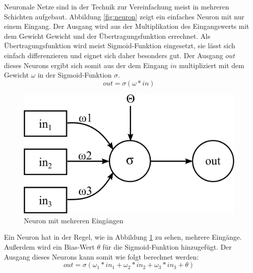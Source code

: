 Neuronale Netze sind in der Technik zur Vereinfachung meist in mehreren Schichten aufgebaut. Abbildung \ref{fig:neuron} zeigt ein einfaches Neuron mit nur einem Eingang. Der Ausgang wird aus der Multiplikation des Eingangswerts mit dem Gewicht Gewicht und der Übertragungsfunktion errechnet. Als Übertragungsfunktion wird meist Sigmoid-Funktion eingesetzt, sie lässt sich einfach differenzieren und eignet sich daher besonders gut. Der Ausgang $out$ dieses Neurons ergibt sich somit aus der dem Eingang $in$ multipliziert mit dem Gewicht $\omega$ in der Sigmoid-Funktion $\sigma$.
$$out = \sigma(\omega * in)$$

\begin{figure}
	\centering
	\includegraphics[scale=1]{images/neuron-multiple-inputs.png}
	\caption{Neuron mit mehreren Eingängen}
	\label{fig:neuron-multiple-inputs}
\end{figure}

Ein Neuron hat in der Regel, wie in Abbildung \ref{fig:neuron-multiple-inputs} zu sehen, mehrere Eingänge. Außerdem wird ein Bias-Wert $\theta$ für die Sigmoid-Funktion hinzugefügt. Der Ausgang dieses Neurons kann somit wie folgt berechnet werden:
$$out = \sigma(\omega_1*in_1 + \omega_2*in_2 + \omega_3*in_3 + \theta)$$

